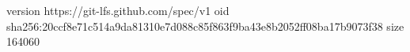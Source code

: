 version https://git-lfs.github.com/spec/v1
oid sha256:20ccf8e71c514a9da81310e7d088c85f863f9ba43e8b2052ff08ba17b9073f38
size 164060
